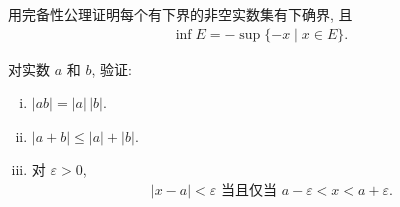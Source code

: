 \documentclass[../../main.tex]{subfiles}
\begin{document}
\begin{exercise}\label{exercise:ch01-06}
用完备性公理证明每个有下界的非空实数集有下确界, 且
\begin{align*}
\inf E=-\sup\{-x\mid x\in E\}.
\end{align*}
\end{exercise}

\begin{exercise}\label{exercise:ch01-07}
对实数 $a$ 和 $b$, 验证:
\begin{enumerate}[(i)]
\item $|ab|=|a|\,|b|$.
\item $|a+b|\leqslant |a|+|b|$.
\item 对 $\varepsilon>0$,
\begin{align*}
|x-a|<\varepsilon\text{ 当且仅当 }a-\varepsilon<x<a+\varepsilon.
\end{align*}
\end{enumerate}
\end{exercise}
\end{document}

